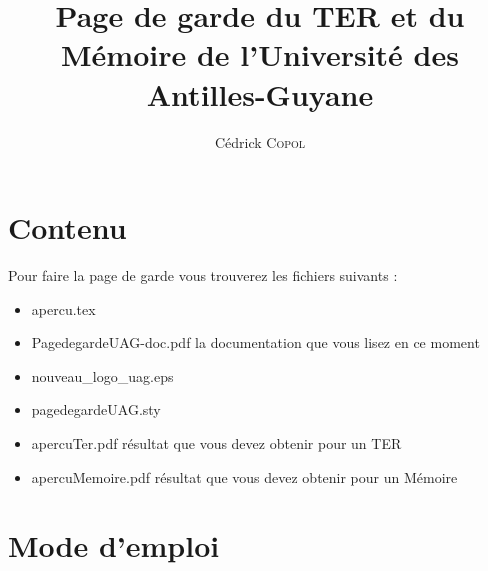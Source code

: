 \documentclass[10pt]{article}
\title{Page de garde du TER et du M\'emoire de l'Universit\'e des Antilles-Guyane}
\author{C\'edrick \textsc{Copol}}
\begin{document}
\maketitle
\tableofcontents

\section{Contenu }
Pour faire la page de garde vous trouverez les fichiers suivants :

\begin{itemize}
 \item 	apercu.tex
 \item	PagedegardeUAG-doc.pdf \og la documentation que vous lisez en ce moment \fg{}
 \item	nouveau\_logo\_uag.eps
 \item	pagedegardeUAG.sty
 \item	apercuTer.pdf \og r\'esultat que vous devez obtenir pour un TER \fg
 \item	apercuMemoire.pdf \og r\'esultat que vous devez obtenir pour un M\'emoire \fg
\end{itemize}

\section{Mode d'emploi }
\end{document}
